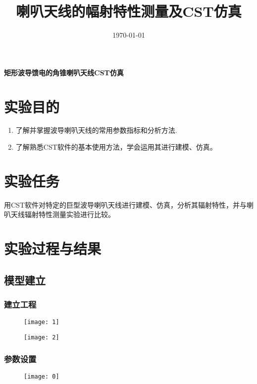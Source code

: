 \documentclass{../source/Experiment}
\title{喇叭天线的幅射特性测量及CST仿真}
\date{\today}
\begin{document}
    \makecover
    \makeheader

    \begin{center}
        \bfseries\Large{矩形波导馈电的角锥喇叭天线CST仿真}
    \end{center}
    \section{实验目的}
        \begin{enumerate}
            \item 了解并掌握波导喇叭天线的常用参数指标和分析方法.
            \item 了解熟悉CST软件的基本使用方法，学会运用其进行建模、仿真。
        \end{enumerate}
    \section{实验任务}
        用CST软件对特定的巨型波导喇叭天线进行建模、仿真，分析其辐射特性，并与喇叭天线辐射特性测量实验进行比较。
    \section{实验过程与结果}
        \subsection{模型建立}
            \subsubsection{建立工程}
                \begin{figure}[H]
                    \centering
                    \texttt{[image: 1]}
                    \caption{}
                \end{figure}

                \begin{figure}[H]
                    \centering
                    \texttt{[image: 2]}
                    \caption{}
                \end{figure}


            \subsubsection{参数设置}
                \begin{figure}[H]
                    \centering
                    \texttt{[image: 0]}
                    \caption{}
                \end{figure}
\end{document}
